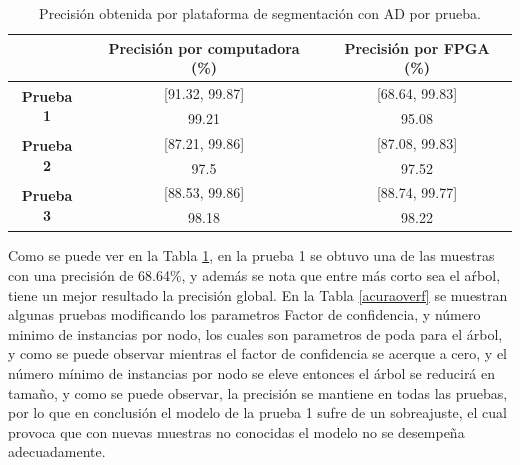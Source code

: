 \documentclass[twoside,spanish,ESP,MSc]{plantillaLabUPV}
\theoremstyle{definition}
\begin{document}
\begin{table}[!tbh]
	\caption{Precisión obtenida por plataforma de segmentación con AD por prueba.}
	\label{acurasgm}
	\centering
\begin{tabular}{c|c|c|}
	\cline{2-3}
	& \textbf{Precisión por computadora (\%)} & \textbf{Precisión por FPGA (\%)} \\ \hline
	\multicolumn{1}{|c|}{\multirow{2}{*}{\textbf{Prueba 1}}} & {[}91.32, 99.87{]}                      & {[}68.64, 99.83{]}               \\ \cline{2-3} 
	\multicolumn{1}{|c|}{}                                   & 99.21                                   & 95.08                            \\ \hline
	\multicolumn{1}{|c|}{\multirow{2}{*}{\textbf{Prueba 2}}} & {[}87.21, 99.86{]}                      & {[}87.08, 99.83{]}               \\ \cline{2-3} 
	\multicolumn{1}{|c|}{}                                   & 97.5                                    & 97.52                            \\ \hline
	\multicolumn{1}{|c|}{\multirow{2}{*}{\textbf{Prueba 3}}} & {[}88.53, 99.86{]}                      & {[}88.74, 99.77{]}               \\ \cline{2-3} 
	\multicolumn{1}{|c|}{}                                   & 98.18                                   & 98.22                            \\ \hline
\end{tabular}
\end{table}

Como se puede ver en la Tabla \ref{acurasgm}, en la prueba 1 se obtuvo una de las muestras con una precisión de 68.64\%, y además se nota que entre más corto sea el aŕbol, tiene un mejor resultado la precisión global. En la Tabla \ref{acuraoverf} se muestran algunas pruebas modificando los parametros Factor de confidencia, y número minimo de instancias por nodo, los cuales son parametros de poda para el árbol, y como se puede observar mientras el factor de confidencia se acerque a cero, y el número mínimo de instancias por nodo se eleve entonces el árbol se reducirá en tamaño, y como se puede observar, la precisión se mantiene en todas las pruebas, por lo que en conclusión el modelo de la prueba 1 sufre de un sobreajuste, el cual provoca que con nuevas muestras no conocidas el modelo no se desempeña adecuadamente.
\end{document}
